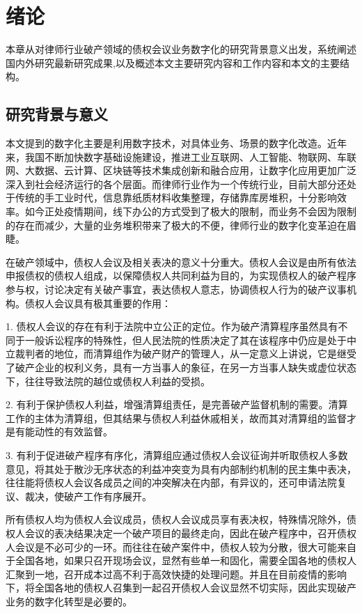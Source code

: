 
\chapter{绪论}
本章从对律师行业破产领域的债权会议业务数字化的研究背景意义出发，系统阐述国内外研究最新研究成果,以及概述本文主要研究内容和工作内容和本文的主要结构。

\section{研究背景与意义}
本文提到的数字化主要是利用数字技术，对具体业务、场景的数字化改造。近年来，我国不断加快数字基础设施建设，推进工业互联网、人工智能、物联网、车联网、大数据、云计算、区块链等技术集成创新和融合应用，让数字化应用更加广泛深入到社会经济运行的各个层面。而律师行业作为一个传统行业，目前大部分还处于传统的手工业时代，信息靠纸质材料收集整理，存储靠库房堆积，十分影响效率。如今正处疫情期间，线下办公的方式受到了极大的限制，而业务不会因为限制的存在而减少，大量的业务堆积带来了极大的不便，律师行业的数字化变革迫在眉睫。

在破产领域中，债权人会议及相关表决的意义十分重大。债权人会议是由所有依法申报债权的债权人组成，以保障债权人共同利益为目的，为实现债权人的破产程序参与权，讨论决定有关破产事宜，表达债权人意志，协调债权人行为的破产议事机构。债权人会议具有极其重要的作用：

1. 债权人会议的存在有利于法院中立公正的定位。作为破产清算程序虽然具有不同于一般诉讼程序的特殊性，但人民法院的性质决定了其在该程序中仍应是处于中立裁判者的地位，而清算组作为破产财产的管理人，从一定意义上讲说，它是继受了破产企业的权利义务，具有一方当事人的象征，在另一方当事人缺失或虚位状态下，往往导致法院的越位或债权人利益的受损。

2. 有利于保护债权人利益，增强清算组责任，是完善破产监督机制的需要。清算工作的主体为清算组，但其结果与债权人利益休戚相关，故而其对清算组的监督才是有能动性的有效监督。

3. 有利于促进破产程序有序化，清算组应通过债权人会议征询并听取债权人多数意见，将其处于散沙无序状态的利益冲突变为具有内部制约机制的民主集中表决，往往能将债权人会议各成员之间的冲突解决在内部，有异议的，还可申请法院复议、裁决，使破产工作有序展开。

所有债权人均为债权人会议成员，债权人会议成员享有表决权，特殊情况除外，债权人会议的表决结果决定一个破产项目的最终走向，因此在破产程序中，召开债权人会议是不必可少的一环。而往往在破产案件中，债权人较为分散，很大可能来自于全国各地，如果只召开现场会议，显然有些单一和固化，需要全国各地的债权人汇聚到一地，召开成本过高不利于高效快捷的处理问题。并且在目前疫情的影响下，将全国各地的债权人召集到一起召开债权人会议显然不切实际，因此实现破产业务的数字化转型是必要的。

